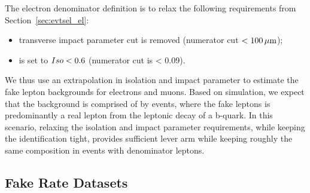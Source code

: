 The electron denominator definition is to relax the following requirements from
Section~\ref{sec:evtsel_el}:
\begin{itemize}
\item transverse impact parameter cut is removed (numerator cut $< 100 \,\mu\text{m}$);
\item \relIso is set to $Iso < 0.6$ (numerator cut is < 0.09).
\end{itemize}

We thus use an extrapolation in isolation and impact parameter to estimate the
fake lepton backgrounds for electrons and muons. Based on simulation, we expect
that the background is comprised of by \ttbar events, where the fake leptons is
predominantly a real lepton from the leptonic decay of a b-quark. In
this scenario, relaxing the isolation and impact parameter requirements, while
keeping the identification tight, provides sufficient lever arm while keeping
roughly the same composition in events with denominator leptons.

\subsection{Fake Rate Datasets}
\label {sec:bkgd_fakes_datasets}

